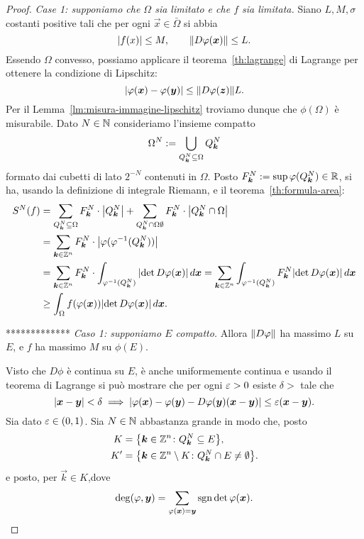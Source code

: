 \begin{proof}
  \emph{Case 1: supponiamo che $\Omega$ sia limitato e che $f$ sia limitata.}
Siano $L,M,\sigma$ costanti positive tali che 
per ogni $\vec x\in \bar \Omega$ si abbia
\[
  {\left|f(x)\right|} \le M, \qquad
  {\left\Vert D\varphi(\boldsymbol x)\right\Vert} \le L.
\]
Essendo $\Omega$ convesso, possiamo applicare il 
teorema~\ref{th:lagrange} di Lagrange 
per ottenere la condizione di Lipschitz:
\[
  {\left|\varphi(\boldsymbol x) - \varphi(\boldsymbol y)\right|} \le {\left\Vert D\varphi(\boldsymbol z)\right\Vert}L.
\]
Per il Lemma~\ref{lm:misura-immagine-lipschitz} troviamo 
dunque che $\phi(\Omega)$ è misurabile.
Dato $N\in {\mathbb N}$ consideriamo l'insieme compatto
\[
  \Omega^N := \bigcup_{Q^N_{\boldsymbol k}\subseteq \Omega} Q^N_{\boldsymbol k}
\]
formato dai cubetti di lato $2^{-N}$ contenuti in $\Omega$.
Posto $F^N_{\boldsymbol k} := \sup \varphi(Q^N_{\boldsymbol k})\in {\mathbb R}$,
si ha, usando la definizione di integrale Riemann,
e il teorema~\ref{th:formula-area}:
\begin{align*}
  S^N(f) 
    &= \sum_{Q^N_{\boldsymbol k}\subseteq \Omega} F^N_{\boldsymbol k} \cdot {\left|Q^N_{\boldsymbol k}\right|}
       + \sum_{Q^N_{\boldsymbol k}\cap \Omega  \emptyset} F^N_{\boldsymbol k} \cdot {\left|Q^N_{\boldsymbol k}\cap \Omega\right|}\\
    &= \sum_{\boldsymbol k \in {\mathbb Z}^n} F^N_{\boldsymbol k} \cdot {\left|\varphi(\varphi^{-1}(Q^N_{\boldsymbol k}))\right|}\\
    &= \sum_{\boldsymbol k \in {\mathbb Z}^n} F^N_{\boldsymbol k} \cdot 
      \int_{\varphi^{-1}(Q^N_{\boldsymbol k})} {\left|\det D\varphi(\boldsymbol x)\right|}\, d\boldsymbol x
    = \sum_{\boldsymbol k \in {\mathbb Z}^n} 
      \int_{\varphi^{-1}(Q^N_{\boldsymbol k})} F^N_{\boldsymbol k} {\left|\det D\varphi(\boldsymbol x)\right|}\, d\boldsymbol x\\
    &\ge \int_{\Omega} f(\varphi(\boldsymbol x)) {\left|\det D\varphi(\boldsymbol x)\right|}\, d\boldsymbol x.
\end{align*}


*************
  \emph{Caso 1: supponiamo $E$ compatto.}
Allora ${\left\Vert D\varphi\right\Vert}$ ha massimo $L$ su $E$, e $f$ ha massimo $M$ 
su $\phi(E)$. 

Visto che $D\phi$ è continua su $E$, è anche uniformemente continua e 
usando il teorema di Lagrange si può mostrare che per ogni $\varepsilon>0$ 
esiste $\delta>$ tale che
\[
 {\left|\boldsymbol x - \boldsymbol y\right|}<\delta 
 \implies 
 {\left|\varphi(\boldsymbol x)-\varphi(\boldsymbol y)-D\varphi(\boldsymbol y)(\boldsymbol x - \boldsymbol y)\right|}
 \le \varepsilon (\boldsymbol x - \boldsymbol y).
\]
Sia dato $\varepsilon\in(0,1)$.
Sia $N\in {\mathbb N}$ abbastanza grande in modo che, posto
\begin{align*}
  K&={\left\{ \boldsymbol k\in {\mathbb Z}^n\colon Q^N_{\boldsymbol k}\subseteq E \right\}},\\
  K'&={\left\{ \boldsymbol k\in {\mathbb Z}^n\setminus K \colon Q^N_{\boldsymbol k}\cap E\neq \emptyset \right\}}.
\end{align*}
e posto, per $\vec k \in K$,dove 
\[
  \deg(\varphi,\boldsymbol y) = \sum_{\varphi(\boldsymbol x)=\boldsymbol y} \operatorname{sgn} \det \varphi(\boldsymbol x).
\]


\end{proof}
